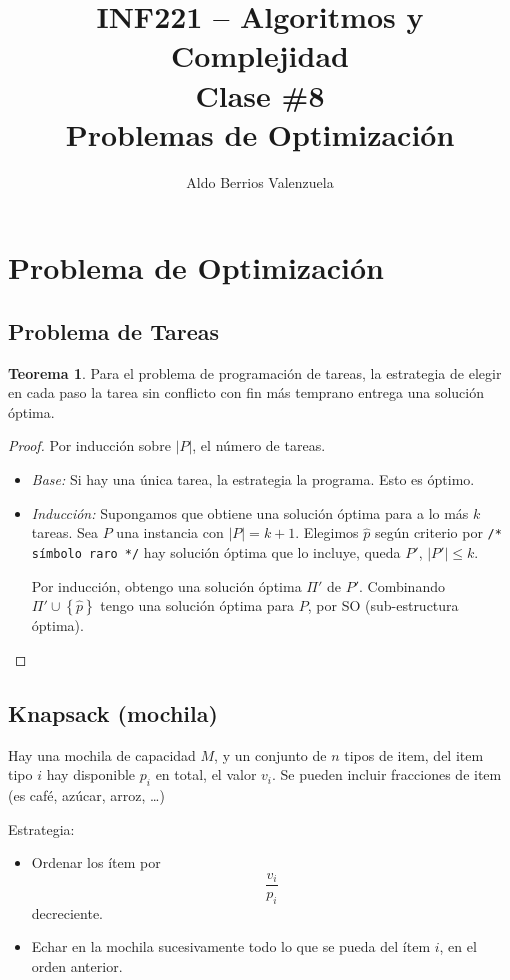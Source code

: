 \documentclass[english, spanish, fleqn, 10pt]{article}
\author{Aldo Berrios Valenzuela}
\title{INF221 -- Algoritmos y Complejidad\\[.4\baselineskip]Clase \#8\\Problemas de Optimización}
\newcommand{\comentarioc}[1]{\texttt{\textcolor{webred}{/* #1 */}}}
\numberwithin{equation}{section}
\newcommand{\llaves}[1]{\left \{ #1 \right \}}
\newcommand{\nabsoluto}[1]{\left| #1 \right|}
\theoremstyle{definition}
\newtheorem{teorema}{Teorema}[section]
\begin{document}
\maketitle
\section{Problema de Optimización}
\subsection{Problema de Tareas}
\begin{teorema}
	Para el problema de programación de tareas, la estrategia de elegir en cada paso la tarea sin conflicto con fin más temprano entrega una solución óptima.
\end{teorema}

\begin{proof}
	Por inducción sobre $\nabsoluto{P}$, el número de tareas.
	\begin{itemize}
		\item \emph{Base:} Si hay una única tarea, la estrategia la programa. Esto es óptimo.
		
		\item \emph{Inducción:} Supongamos que obtiene una solución óptima para a lo más $k$ tareas. Sea $P$ una instancia con $\nabsoluto{P}=k+1$. Elegimos $\hat{p}$ según criterio por \comentarioc{símbolo raro} hay solución óptima que lo incluye, queda $P'$, $\nabsoluto{P'}\leq k$.
		
		Por inducción, obtengo una solución óptima $\Pi'$ de $P'$. Combinando $\Pi'\cup\llaves{\hat p}$ tengo una solución óptima para $P$, por SO (sub-estructura óptima).
	\end{itemize}
\end{proof}

\subsection{Knapsack (mochila)}
Hay una mochila de capacidad $M$, y un conjunto de $n$ tipos de item, del item tipo $i$ hay disponible $p_i$ en total, el valor $v_i$. Se pueden incluir fracciones de item (es café, azúcar, arroz, \ldots)

Estrategia:
\begin{itemize}
	\item Ordenar los ítem por
	\begin{equation*}
	\dfrac{v_i}{p_i}
	\end{equation*}
	decreciente.
	
	\item Echar en la mochila sucesivamente todo lo que se pueda del ítem $i$, en el orden anterior.
\end{itemize}
\end{document}
